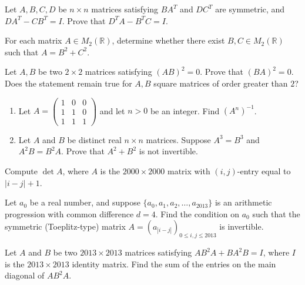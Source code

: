 \documentclass[12pt]{article}
\begin{document}
\begin{problem}
Let $A,B,C,D$ be $n\times n$ matrices satisfying $BA^T$ and $DC^T$ are symmetric, and $DA^T-CB^T=I$. Prove that $D^TA-B^TC=I$.
\end{problem}

\begin{problem}
For each matrix $A\in M_2(\mathbb{R})$, determine whether there exist $B,C\in M_2(\mathbb{R})$ such that $A=B^2+C^2$.
\end{problem}

\begin{problem}
Let $A,B$ be two $2\times 2$ matrices satisfying $(AB)^2=0$. Prove that $(BA)^2=0$. Does the statement remain true for $A,B$ square matrices of order greater than $2$?
\end{problem}

\begin{problem}
\begin{enumerate}[label=\arabic*.]
\item Let $A=\begin{pmatrix}1&0&0\\1&1&0\\1&1&1\end{pmatrix}$ and let $n>0$ be an integer. Find $(A^n)^{-1}$.
\item Let $A$ and $B$ be distinct real $n\times n$ matrices. Suppose $A^3=B^3$ and $A^2B=B^2A$. Prove that $A^2+B^2$ is not invertible.
\end{enumerate}
\end{problem}

\begin{problem}
Compute $\det A$, where $A$ is the $2000\times 2000$ matrix with $(i,j)$-entry equal to $|i-j|+1$.
\end{problem}

\begin{problem}
Let $a_0$ be a real number, and suppose $\{a_0,a_1,a_2,\dots,a_{2013}\}$ is an arithmetic progression with common difference $d=4$. Find the condition on $a_0$ such that the symmetric (Toeplitz-type) matrix $A=(a_{|i-j|})_{0\le i,j\le 2013}$ is invertible.
\end{problem}

\begin{problem}
Let $A$ and $B$ be two $2013\times 2013$ matrices satisfying $AB^2A+BA^2B=I$, where $I$ is the $2013\times 2013$ identity matrix. Find the sum of the entries on the main diagonal of $AB^2A$.
\end{problem}
\end{document}
